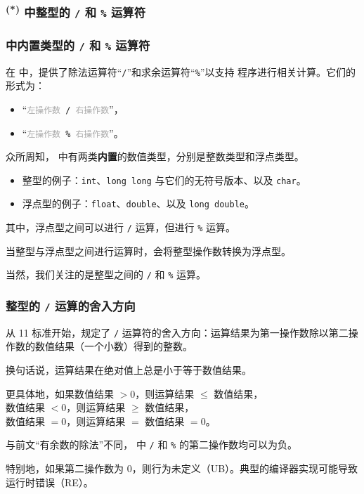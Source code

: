 \subsubsection{\texorpdfstring{\textsuperscript{(*) }}{(*) }\Cpp{} 中整型的 \texttt{/} 和 \texttt{\%} 运算符}
\begin{frame}[c]
  \progressnow
\end{frame}
\begin{frame}
  \frametitle{\Cpp{} 中\textbf{内置类型}的 \texttt{/} 和 \texttt{\%} 运算符}
  在 \Cpp{} 中，提供了\alert{除法运算符}“\texttt{/}”和\alert{求余运算符}“\texttt{\%}”以支持 \Cpp{} 程序进行相关计算。它们的形式为：
  \begin{itemize}
    \item “\texttt{\textcolor{darkgray}{左操作数} / \textcolor{darkgray}{右操作数}}”，
    \item “\texttt{\textcolor{darkgray}{左操作数} \% \textcolor{darkgray}{右操作数}}”。
  \end{itemize}
  \pause
  
  \emptyline
  众所周知，\Cpp{} 中有两类\textbf{内置}的数值类型，分别是\alert{整数类型}和\alert{浮点类型}。
  \begin{itemize}
    \item 整型的例子：\texttt{int}、\texttt{long long} 与它们的无符号版本、以及 \texttt{char}。
    \item 浮点型的例子：\texttt{float}、\texttt{double}、以及 \texttt{long double}。
  \end{itemize}
  \pause
  其中，浮点型之间可以进行 \texttt{/} 运算，但进行 \texttt{\%} 运算。
  
  当整型与浮点型之间进行运算时，会将整型操作数转换为浮点型。
  \pause
  
  \emptyline
  当然，我们关注的是整型之间的 \texttt{/} 和 \texttt{\%} 运算。
\end{frame}
\begin{frame}
  \frametitle{整型的 \texttt{/} 运算的舍入方向}
  从 \Cpp{}11 标准开始，规定了 \texttt{/} 运算符的舍入方向：运算结果为第一操作数除以第二操作数的数值结果（一个小数）得到的整数。
  \pause
  
  \emptyline
  换句话说，运算结果\alert{在绝对值上}总是小于等于数值结果。
  
  更具体地，如果数值结果 $> 0$，则运算结果 $\le$ 数值结果，\\
  \-\hspace{7em}数值结果 $< 0$，则运算结果 $\ge$ 数值结果，\\
  \-\hspace{7em}数值结果 $= 0$，则运算结果 $=$ 数值结果 $= 0$。
  \pause
  
  \emptyline
  与前文“有余数的除法”不同，\Cpp{} 中 \texttt{/} 和 \texttt{\%} 的\alert{第二操作数均可以为负}。
  \pause
  
  \emptyline
  特别地，如果第二操作数为 $0$，则行为未定义（UB）。典型的编译器实现可能导致运行时错误（RE）。
\end{frame}
